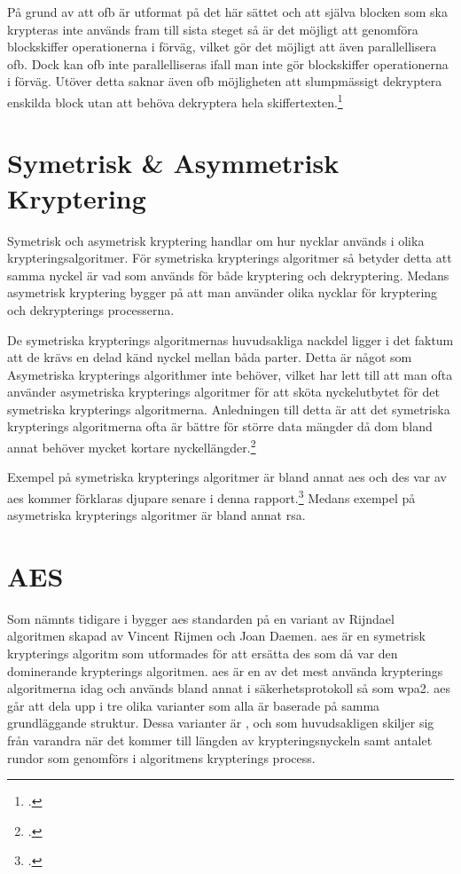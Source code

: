 På grund av att \acrshort{ofb} är utformat på det här sättet och att själva blocken som
ska krypteras inte används fram till sista steget så är det möjligt att genomföra blockskiffer
operationerna i förväg, vilket gör det möjligt att även parallellisera \acrshort{ofb}. Dock
kan \acrshort{ofb} inte parallelliseras ifall man inte gör blockskiffer operationerna
i förväg. Utöver detta saknar även \acrshort{ofb} möjligheten att slumpmässigt dekryptera
enskilda block utan att behöva dekryptera hela skiffertexten.\footcite{dworkin2001sp}

\section{Symetrisk \& Asymmetrisk Kryptering}
\label{sec:symmetric-asymmetric-encryption}
Symetrisk och asymetrisk kryptering handlar om hur nycklar används i olika
krypteringsalgoritmer. För symetriska krypterings algoritmer så betyder detta
att samma nyckel är vad som används för både kryptering och dekryptering. Medans
asymetrisk kryptering bygger på att man använder olika nycklar för kryptering och
dekrypterings processerna.

De symetriska krypterings algoritmernas huvudsakliga nackdel ligger i det faktum att
de krävs en delad känd nyckel mellan båda parter. Detta är något som Asymetriska
krypterings algorithmer inte behöver, vilket har lett till att man ofta använder
asymetriska krypterings algoritmer för att sköta nyckelutbytet för det symetriska
krypterings algoritmerna. Anledningen till detta är att det symetriska krypterings
algoritmerna ofta är bättre för större data mängder då dom bland annat behöver mycket
kortare nyckellängder.\footcite{symencrypt}

Exempel på symetriska krypterings algoritmer är bland annat \acrshort{aes} och
\acrshort{des} var av \acrshort{aes} kommer förklaras djupare senare i denna rapport.\footcite{symencrypt}
Medans exempel på asymetriska krypterings algoritmer är bland annat \gls{rsa}.

\section{AES}
\label{sec:aes}

Som nämnts tidigare i  bygger \acrshort{aes} standarden på en variant av Rijndael  algoritmen
skapad av Vincent Rijmen och Joan Daemen. \acrshort{aes} är en symetrisk  krypterings algoritm som utformades för att ersätta
\acrshort{des} som då var den dominerande krypterings algoritmen. \acrshort{aes} är en av det mest använda krypterings algoritmerna idag
och används bland annat i säkerhetsprotokoll så som \acrfull{wpa2}. \acrshort{aes} går att dela upp i tre olika varianter
som alla är baserade på samma grundläggande struktur. Dessa varianter är ,  och  som huvudsakligen
skiljer sig från varandra när det kommer till längden av krypteringsnyckeln samt antalet rundor som genomförs i algoritmens krypterings process.


